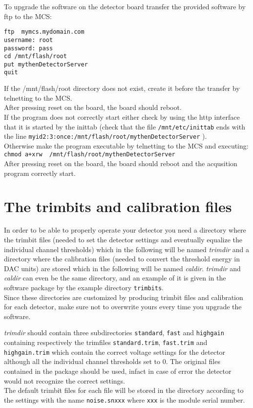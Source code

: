 \documentclass{report}
\begin{document}
To upgrade the software on the detector board transfer the provided software by ftp to the MCS:
\begin{verbatim}
ftp  mymcs.mydomain.com
username: root
password: pass
cd /mnt/flash/root
put mythenDetectorServer
quit
\end{verbatim}
If the  /mnt/flash/root directory does not exist, create it before the transfer by telnetting to the MCS.\\
After pressing reset on the board, the board should reboot.\\
If the program does not correctly start either check by using the http interface that it is started by the inittab (check that the file \verb=/mnt/etc/inittab= ends with the line \verb=myid2:3:once:/mnt/flash/root/mythenDetectorServer= ). \\
Otherwise make the program executable by telnetting to the MCS and executing:
\verb=chmod a+xrw  /mnt/flash/root/mythenDetectorServer=\\
After pressing reset on the board, the board should reboot and the acqusition program correctly start.

\section{The trimbits and calibration files} \label{sec:trimdir}
In order to be able to properly operate your detector you need a directory where the trimbit files (needed to set the detector settings and eventually equalize the individual channel thresholds) which in the following will be named \textit{trimdir} and a directory where the calibration files (needed to convert the threshold energy in DAC units) are stored which in the following will be named \textit{caldir}. 
\textit{trimdir} and \textit{caldir} can even be the same directory, and an example of it is given in the software package by the example directory \verb=trimbits=. \\
Since these directories are customized by producing trimbit files and calibration for each detector, make sure not to overwrite yours every time you upgrade the software.

\textit{trimdir} should contain three subdirectories \verb=standard=,  \verb=fast= and  \verb=highgain= containing respectively the trimfiles \verb=standard.trim=,  \verb=fast.trim= and  \verb=highgain.trim= which contain the correct voltage settings for the detector although all the individual channel thresholds set to 0. The original files contained in the package should be used, infact in case of error the detector would not recognize the correct settings.\\
The default trimbit files for each file will be stored in the directory according to the settings with the name \verb=noise.snxxx= where \verb=xxx= is the module serial number.\\
\end{document}
